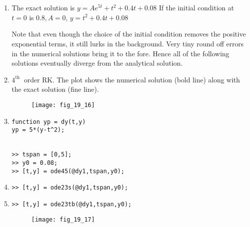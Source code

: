 \documentclass[../main.tex]{subfiles}
\begin{document}
\section{}
\begin{enumerate}[label=\bfseries(\alph*)]
\item The exact solution is
	\bigbreak
$y=A e^{5 t}+t^{2}+0.4 t+0.08$
	\bigbreak
If the initial condition at $t=0$ is $0.8, A=0$,
	\bigbreak
$y=t^{2}+0.4 t+0.08$
	\bigbreak
\begin{blockquote}
Note that even though the choice of the initial condition removes the positive exponential terms, it still lurks in the background. Very tiny round off errors in the numerical solutions bring it to the fore. Hence all of the following solutions eventually diverge from the analytical solution.
\end{blockquote}
	\bigbreak
\item $4^{\text {th }}$ order RK. The plot shows the numerical solution (bold line) along with the exact solution (fine line).
	\bigbreak
	\begin{figure}[H]
		\texttt{[image: fig\_19\_16]}
		\label{fig:fig_19_16}
	\end{figure}
	\bigbreak
\item
	\bigbreak
\begin{lstlisting}[numbers=none]
function yp = dy(t,y)
yp = 5*(y-t^2);


>> tspan = [0,5];
>> y0 = 0.08;
>> [t,y] = ode45(@dy1,tspan,y0); 
\end{lstlisting}
	\bigbreak
\item
	\bigbreak
\begin{lstlisting}[numbers=none]
>> [t,y] = ode23s(@dy1,tspan,y0); 
\end{lstlisting}
	\bigbreak
\item
	\bigbreak
\begin{lstlisting}[numbers=none]
>> [t,y] = ode23tb(@dy1,tspan,y0);
\end{lstlisting}
	\bigbreak
	\begin{figure}[H]
		\texttt{[image: fig\_19\_17]}
		\label{fig:fig_19_17}
	\end{figure}
\end{enumerate}
\end{document}
